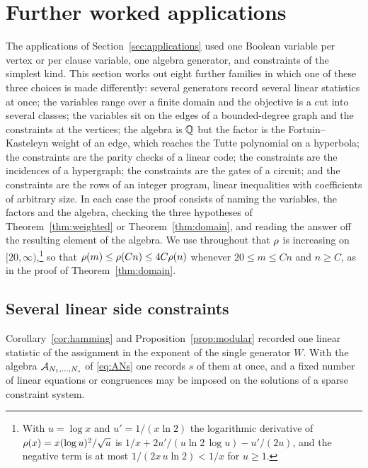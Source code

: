 \section{Further worked applications}\label{sec:more}\enlargethispage{4pt}

The applications of Section~\ref{sec:applications} used one Boolean variable
per vertex or per clause variable, one algebra generator, and constraints of the
simplest kind. This section works out eight further families in which one of
these three choices is made differently: several generators record several
linear statistics at once; the variables range over a finite domain and the
objective is a cut into several classes; the variables sit on the edges of a
bounded-degree graph and the constraints at the vertices; the algebra is $\mathbb{Q}$
but the factor is the Fortuin--Kasteleyn weight of an edge, which reaches the
Tutte polynomial on a hyperbola; the constraints are the parity checks of a
linear code; the constraints are the incidences of a hypergraph; the
constraints are the gates of a circuit; and the constraints are the rows of
an integer program, linear inequalities with coefficients of arbitrary size. In each case the proof consists of
naming the variables, the factors and the algebra, checking the three
hypotheses of Theorem~\ref{thm:weighted} or Theorem~\ref{thm:domain}, and
reading the answer off the resulting element of the algebra. We use throughout
that $\rho$ is increasing on $[20,\infty)$,\footnote{With $u=\log x$ and
$u'=1/(x\ln 2)$ the logarithmic derivative of $\rho(x)=x(\log u)^2/\sqrt u$ is
$1/x+2u'/(u\ln 2\,\log u)-u'/(2u)$, and the negative term is at most
$1/(2x\,u\ln 2)<1/x$ for $u\ge 1$.} so that $\rho(m)\le\rho(Cn)\le 4C\rho(n)$
whenever $20\le m\le Cn$ and $n\ge C$, as in the proof of
Theorem~\ref{thm:domain}.

\subsection{Several linear side constraints}\label{ssec:linear}
Corollary~\ref{cor:hamming} and Proposition~\ref{prop:modular} recorded one
linear statistic of the assignment in the exponent of the single generator $W$.
With the algebra $\mathcal{A}_{N_1,\dots,N_s}$ of \eqref{eq:ANs} one records $s$ of them
at once, and a fixed number of linear equations or congruences may be imposed
on the solutions of a sparse constraint system.


